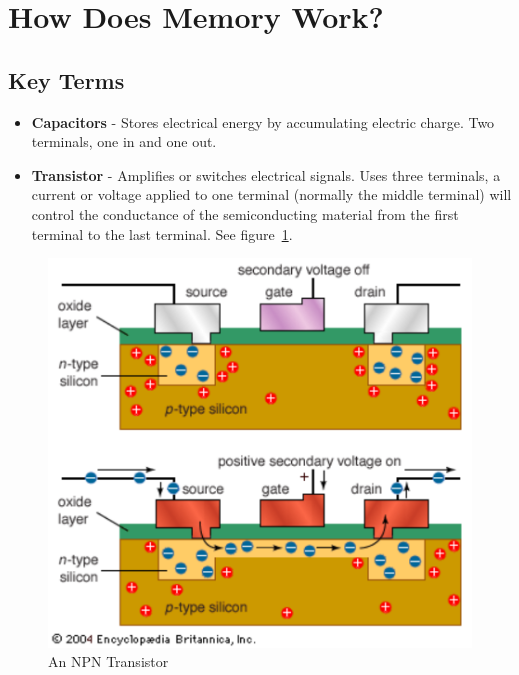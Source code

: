 \section{How Does Memory Work?}

\subsection{Key Terms}
\begin{itemize}
  \item \textbf{Capacitors} - Stores electrical energy by accumulating electric charge. Two terminals, one in and one out.
  \item \textbf{Transistor} - Amplifies or switches electrical signals. Uses three terminals, a current or voltage applied to one terminal (normally the middle terminal) will control the conductance of the semiconducting material from the first terminal to the last terminal. See figure~\ref{fig-tran}.
\end{itemize}

\begin{figure}
\centering
  \includegraphics[scale=0.25]{./chapters/hardware-background/assets/pnp.png}
  \caption{An NPN Transistor~\cite{britannica-transistor}}\label{fig-tran}
\end{figure}
